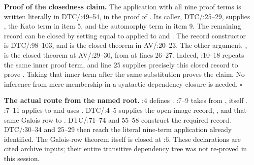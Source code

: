 \documentclass[11pt,a4paper]{article}
\theoremstyle{definition}
\renewcommand{\paragraph}[1]{\par\smallskip\noindent\textbf{#1}\quad\ignorespaces}
\begin{document}
\paragraph{Proof of the closedness claim.}
The application with all nine proof terms is written literally in
DTC/:49--54, in the proof of
.
Its caller, DTC/:25--29,
supplies , the Kato term in item 5, and the automorphy term in
item 9.  The remaining record can be closed by setting
 equal to
applied to 
and .
The record constructor is
DTC/:98--103,
and  is the closed theorem in
AV/:20--23.
The other argument, , is
the closed theorem at
AV/:29--30,
from  at lines 26--27.
Indeed, :10--18 repeats the same inner
 proof term, and line 25 supplies precisely this closed
record to prove .  Taking that inner term after the same
substitution proves the claim.  No inference from mere membership in
a syntactic dependency closure is needed. \hfill$\square$

\paragraph{The actual route from the named root.}
:4 defines .
:7--9 takes
 from , itself
.
:7--11
applies  to
and uses .
DTC/:4--5 supplies the open-image record,
, and that same
Galois row to .
DTC/:71--74 and 55--58 construct the required
 record.
DTC/:30--34 and 25--29 then
reach the literal nine-term application already identified.
The Galois-row theorem itself is closed at
:6.
These declarations are cited archive inputs; their entire transitive
dependency tree was not re-proved in this session.
\end{document}
